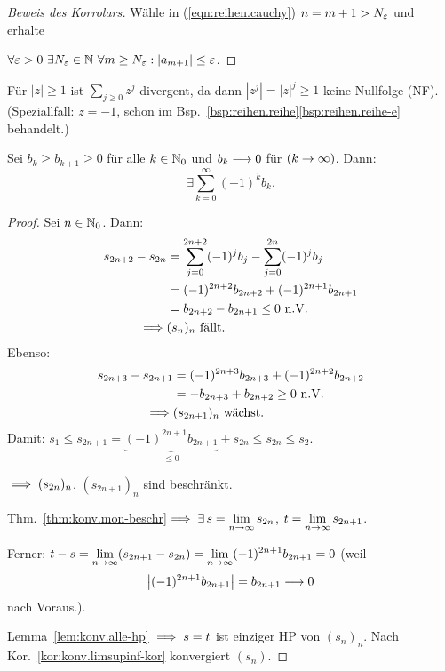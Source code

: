 \documentclass[12pt]{scrreprt}
\begin{document}
\begin{proof}[Beweis des Korrolars] Wähle in (\ref{eqn:reihen.cauchy}) $n=m+1>N_\varepsilon$ und erhalte

$\forall\ep > 0\ \exists \nat{N_\ep}\ \forall m\geq N_\ep: \abs{a_{m+1}}\leq\ep$.
\end{proof}

\begin{bsp}
  \label{bsp:reihen.konv-nf}
  Für $|z|\geq 1$ ist $\sum_{j\geq 0}z^j$ divergent, da dann $|z^j|=|z|^j\geq 1$ keine Nullfolge (NF). (Speziallfall: $z=-1$, schon im Bsp.~\ref{bsp:reihen.reihe}\ref{bsp:reihen.reihe-e} behandelt.)
\end{bsp}

\begin{satz}
  \label{satz:reihen.leibniz}
  Sei $b_k\geq b_{k+1}\geq 0$ für alle $k\in\mathbb{N}_0$ und $b_k\longrightarrow 0$ für $(k\rightarrow\infty)$. Dann:
  \[\exists\sum^\infty_{k=0}(-1)^k b_k.\]
\end{satz}

\begin{proof}
Sei $n\in\mathbb{N}_0$. Dann:
\begin{align*}
s_{2n+2}-s_{2n} &=\sum^{2n+2}_{j=0}(-1)^j b_j -\sum^{2n}_{j=0}(-1)^j b_j\\
&=(-1)^{2n+2}b_{2n+2}+(-1)^{2n+1}b_{2n+1}\\
&=b_{2n+2}-b_{2n+1}\leq 0\ \text{n.V.}\\
\implies& (s_n)_n\ \text{fällt.}
\end{align*}
Ebenso:
\begin{align*}
s_{2n+3}-s_{2n+1} &= (-1)^{2n+3}b_{2n+3}+(-1)^{2n+2}b_{2n+2}\\
&=-b_{2n+3}+b_{2n+2}\geq 0\ \text{n.V.}\\
\implies&(s_{2n+1})_n\ \text{wächst.}
\end{align*}
Damit: $s_1 \leq s_{2n+1} = \underbrace{(-1)^{2n+1}b_{2n+1}}_{\leq 0} + s_{2n} \leq s_{2n} \leq s_2$.

$\implies (s_{2n})_n$, $(s_{2n+1})_n$ sind beschränkt.

Thm.~\ref{thm:konv.mon-beschr}$\implies\exists\,s=\displaystyle\lim_{n\rightarrow\infty}s_{2n}$, $t=\displaystyle\lim_{n\rightarrow\infty}s_{2n+1}$.

\noindent Ferner: $t-s = \displaystyle\lim_{n\rightarrow\infty}(s_{2n+1}-s_{2n}) = \displaystyle\lim_{n\rightarrow\infty}(-1)^{2n+1}b_{2n+1}=0$ (weil \[\left\lvert(-1)^{2n+1}b_{2n+1}\right\lvert = b_{2n+1}\longrightarrow 0\] nach Voraus.).

Lemma~\ref{lem:konv.alle-hp} $\implies s=t$ ist einziger HP von $(s_n)_n$. Nach Kor.~\ref{kor:konv.limsupinf-kor} konvergiert $(s_n)$.
\end{proof}
\end{document}
